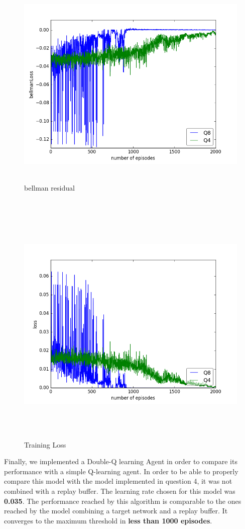 \documentclass{report}
\begin{document}
\begin{figure}[H]
    \begin{minipage}[c]{.49\linewidth}
        \centering
        \includegraphics[width = \linewidth]{plots/a8/bellmanLoss.png}
        \caption{bellman residual}
    \end{minipage}
    \hfill%
    \begin{minipage}[c]{.49\linewidth}
        \centering
        \includegraphics[width = \linewidth]{plots/a8/loss.png}
        \caption{Training Loss}
    \end{minipage}
\end{figure}


Finally, we implemented a Double-Q learning Agent in order to compare its performance with a simple Q-learning agent. In order to be able to properly compare this model with the model implemented in question 4, it was not combined with a replay buffer. The learning rate chosen for this model was \textbf{0.035}. The performance reached by this algorithm is comparable to the ones reached by the model combining a target network and a replay buffer. It converges to the maximum threshold in \textbf{less than 1000 episodes}.
\end{document}
